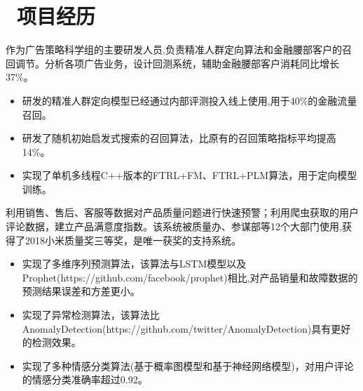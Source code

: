 \documentclass{resume}
\begin{document}

\section{\faUsers\ 项目经历}

\begin{onehalfspacing}
  作为广告策略科学组的主要研发人员,负责精准人群定向算法和金融腰部客户的召回调节。分析各项广告业务，设计回测系统，辅助金融腰部客户消耗同比增长37\%。
\begin{itemize}
  \item 研发的精准人群定向模型已经通过内部评测投入线上使用,用于40\%的金融流量召回。
  \item 研发了随机初始启发式搜索的召回算法，比原有的召回策略指标平均提高14\%。
  \item 实现了单机多线程C++版本的FTRL+FM、FTRL+PLM算法，用于定向模型训练。
\end{itemize}
\end{onehalfspacing}


\begin{onehalfspacing}
利用销售、售后、客服等数据对产品质量问题进行快速预警；利用爬虫获取的用户评论数据，建立产品满意度指数。该系统被质量办、参谋部等12个大部门使用,获得了2018小米质量奖三等奖，是唯一获奖的支持系统。
\begin{itemize}
  \item 实现了多维序列预测算法，该算法与LSTM模型以及Prophet(https://github.com/facebook/prophet)相比,对产品销量和故障数据的预测结果误差和方差更小。
  \item 实现了异常检测算法，该算法比AnomalyDetection(https://github.com/twitter/AnomalyDetection)具有更好的检测效果。
  \item 实现了多种情感分类算法(基于概率图模型和基于神经网络模型)，对用户评论的情感分类准确率超过0.92。
\end{itemize}
\end{onehalfspacing}
\end{document}
